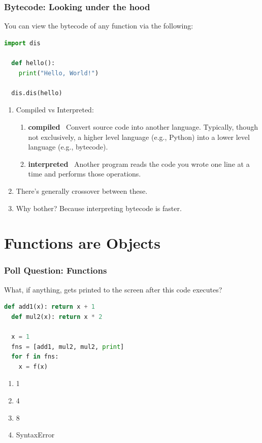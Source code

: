 \documentclass{beamer}
\begin{document}
%
%
\begin{frame}[fragile]
  \frametitle{Bytecode: Looking under the hood}
  You can view the bytecode of any function via the following:
  \begin{lstlisting}[language=Python, autogobble]
  import dis

  def hello():
    print("Hello, World!")

  dis.dis(hello)
  \end{lstlisting}
  \vfill
  \begin{enumerate}[A]
    \pause
    \item Compiled vs Interpreted:
      \begin{enumerate}
        \pause
      \item \textbf{compiled} \textrightarrow \ Convert source code into another language. Typically, though not exclusively, a higher level language (e.g., Python) into a lower level language (e.g., bytecode).
        \pause
        \item \textbf{interpreted} \textrightarrow \ Another program reads the code you wrote one line at a time and performs those operations.
      \end{enumerate}
    \pause
    \item There's generally crossover between these.
    \pause
    \item Why bother? Because interpreting bytecode is faster.
  \end{enumerate}
\end{frame}

\section{Functions are Objects}

%
%
\begin{frame}[fragile]
  \frametitle{Poll Question: Functions}
  What, if anything, gets printed to the screen after this code executes?
  \begin{lstlisting}[language=Python, autogobble]
  def add1(x): return x + 1
  def mul2(x): return x * 2

  x = 1
  fns = [add1, mul2, mul2, print]
  for f in fns:
    x = f(x)
  \end{lstlisting}
  \vfill
  \begin{enumerate}[A]
    \item 1
    \item 4
    \item 8
    \item SyntaxError
  \end{enumerate}
\end{frame}
\end{document}
